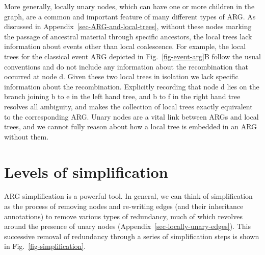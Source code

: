 \documentclass{article}
\newcommand{\noderef}[1]{\textsf{#1}}
\begin{document}
More generally, locally unary nodes,
which can have one or more children in the graph,
are a common and important feature
of many different types of ARG.
As discussed in Appendix~\ref{sec-ARG-and-local-trees},
without these nodes marking the passage
of ancestral material through specific ancestors, the local trees
lack information about events other than local coalescence.
For example, the local trees for the classical event ARG
depicted in Fig.~\ref{fig-event-arg}B follow the usual conventions
and do not include any information about the recombination
that occurred at node \noderef{d}. Given these two local trees
in isolation
we lack specific information about the recombination.
Explicitly recording that node \noderef{d} lies on the
branch joining \noderef{b} to \noderef{e} in the left hand
tree, and \noderef{b} to \noderef{f} in the right hand tree
resolves all ambiguity, and makes the collection of local
trees exactly equivalent to the corresponding ARG.
Unary nodes are a vital link between ARGs and local trees, and we
cannot fully reason about how a local tree is embedded in an ARG
without them.

\section{Levels of simplification}
\label{sec-ARG-simplification}
ARG simplification is a powerful tool.
In general, we can think of
simplification as the process
of removing nodes and re-writing edges (and their inheritance annotations)
to remove various types of redundancy, much of which
revolves around the presence of unary nodes (Appendix~\ref{sec-locally-unary-edges}).
This successive removal of redundancy
through a series of simplification steps is shown
in Fig.~\ref{fig-simplification}.
\end{document}

